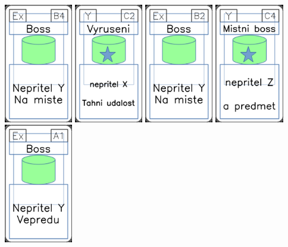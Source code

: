\documentclass[a4paper]{article}
\begin{document}
	\includegraphics[width=3.0cm]{img-4_8}
	\includegraphics[width=3.0cm]{img-5_41}
	\includegraphics[width=3.0cm]{img-4_6}
	\includegraphics[width=3.0cm]{img-5_43}
	\includegraphics[width=3.0cm]{img-4_0}
\end{document}
